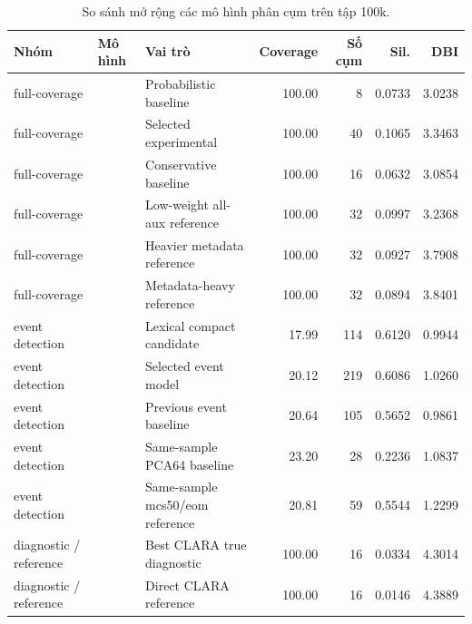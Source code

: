 \begin{table}[htbp]
\centering
\scriptsize
\caption{So sánh mở rộng các mô hình phân cụm trên tập 100k.}
\label{tab:extended_algorithm_comparison}
\begin{tabularx}{\textwidth}{L{0.17\textwidth} L{0.31\textwidth} L{0.24\textwidth} r r r r}
\toprule
Nhóm & Mô hình & Vai trò & Coverage & Số cụm & Sil. & DBI \\
\midrule
full-coverage &  & Probabilistic baseline & 100.00 & 8 & 0.0733 & 3.0238 \\
full-coverage &  & Selected experimental & 100.00 & 40 & 0.1065 & 3.3463 \\
full-coverage &  & Conservative baseline & 100.00 & 16 & 0.0632 & 3.0854 \\
full-coverage &  & Low-weight all-aux reference & 100.00 & 32 & 0.0997 & 3.2368 \\
full-coverage &  & Heavier metadata reference & 100.00 & 32 & 0.0927 & 3.7908 \\
full-coverage &  & Metadata-heavy reference & 100.00 & 32 & 0.0894 & 3.8401 \\
\midrule
event detection &  & Lexical compact candidate & 17.99 & 114 & 0.6120 & 0.9944 \\
event detection &  & Selected event model & 20.12 & 219 & 0.6086 & 1.0260 \\
event detection &  & Previous event baseline & 20.64 & 105 & 0.5652 & 0.9861 \\
event detection &  & Same-sample PCA64 baseline & 23.20 & 28 & 0.2236 & 1.0837 \\
event detection &  & Same-sample mcs50/eom reference & 20.81 & 59 & 0.5544 & 1.2299 \\
\midrule
diagnostic / reference &  & Best CLARA true diagnostic & 100.00 & 16 & 0.0334 & 4.3014 \\
diagnostic / reference &  & Direct CLARA reference & 100.00 & 16 & 0.0146 & 4.3889 \\

\end{tabularx}
\end{table}
